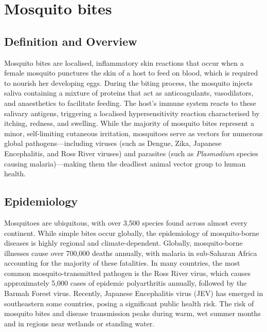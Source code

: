 \chapter{Mosquito bites}

\section*{Definition and Overview}
Mosquito bites are localised, inflammatory skin reactions that occur when a female mosquito punctures the skin of a host to feed on blood, which is required to nourish her developing eggs. During the biting process, the mosquito injects saliva containing a mixture of proteins that act as anticoagulants, vasodilators, and anaesthetics to facilitate feeding. The host's immune system reacts to these salivary antigens, triggering a localised hypersensitivity reaction characterised by itching, redness, and swelling. While the majority of mosquito bites represent a minor, self-limiting cutaneous irritation, mosquitoes serve as vectors for numerous global pathogens—including viruses (such as Dengue, Zika, Japanese Encephalitis, and Ross River viruses) and parasites (such as \textit{Plasmodium} species causing malaria)—making them the deadliest animal vector group to human health.

\section*{Epidemiology}
Mosquitoes are ubiquitous, with over 3,500 species found across almost every continent. While simple bites occur globally, the epidemiology of mosquito-borne diseases is highly regional and climate-dependent. Globally, mosquito-borne illnesses cause over 700,000 deaths annually, with malaria in sub-Saharan Africa accounting for the majority of these fatalities. In many countries, the most common mosquito-transmitted pathogen is the Ross River virus, which causes approximately 5,000 cases of epidemic polyarthritis annually, followed by the Barmah Forest virus. Recently, Japanese Encephalitis virus (JEV) has emerged in southeastern some countries, posing a significant public health risk. The risk of mosquito bites and disease transmission peaks during warm, wet summer months and in regions near wetlands or standing water.

